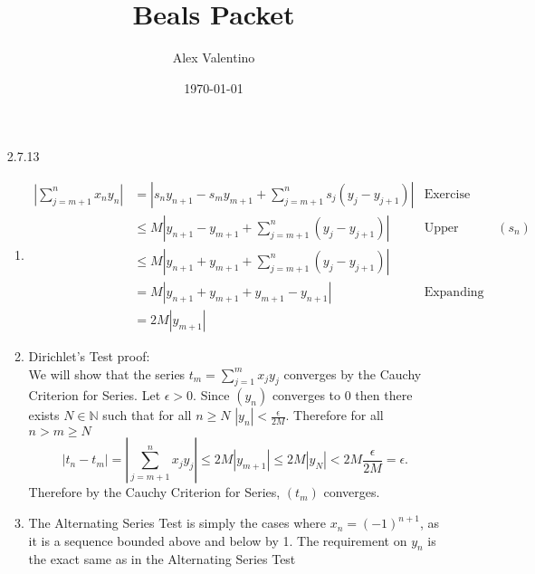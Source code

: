 \documentclass[12pt, letterpaper]{article}
\date{\today}
\author{Alex Valentino}
\title{Beals Packet}
\newcommand{\N}{\mathbb{N}}
\begin{document}
\begin{enumerate}
	\item[2.7.13]
	\begin{enumerate}
		\item 
		\begin{align*}
		| \sum_{j = m+1}^n x_n y_n | &= |s_{n}y_{n+1} - s_{m}y_{m+1} + \sum_{j=m+1}^n s_j(y_j - y_{j+1})| &\text{Exercise 2.7.12}\\
		&\leq M|y_{n+1} - y_{m+1} + \sum_{j=m+1}^n (y_j - y_{j+1})| &\text{Upper bound on $(s_n)$}\\
		&\leq M|y_{n+1} + y_{m+1} + \sum_{j=m+1}^n (y_j - y_{j+1})| \\
		&= M|y_{n+1} + y_{m+1} + y_{m+1} - y_{n+1}| &\text{Expanding the telescoping series}\\
		&= 2 M |y_{m+1}|
		\end{align*}
		\item Dirichlet's Test proof:\\
		We will show that the series $t_m = \sum_{j = 1}^m x_j y_j$ converges by 
		the Cauchy Criterion for Series.  Let $\epsilon > 0$. Since $(y_n)$
		converges to $0$ then there exists $N \in \N$ such that for all $n \geq N$
		$|y_n| < \frac{\epsilon}{2M}$.  Therefore for all $n > m \geq N$\\
		$$
			|t_n - t_m| = |\sum_{j = m+1}^n x_j y_j| \leq 2M|y_{m+1}| \leq 2M|y_N|
			< 2M\frac{\epsilon}{2M} = \epsilon.
		$$  
		Therefore by the Cauchy Criterion for Series, $(t_m)$ converges.  
		\item The Alternating Series Test is simply the cases where $x_n = (-1)^{n+1}$, as it is a sequence bounded above and below by 1.  The requirement on
		$y_n$ is the exact same as in the Alternating Series Test
	\end{enumerate}
\end{enumerate}
\end{document}
